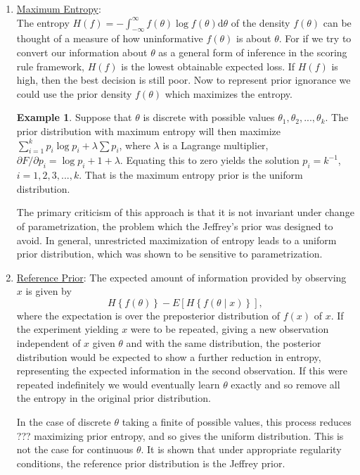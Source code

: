 \documentclass[lecture,12pt,]{pcms-l}
\numberwithin{section}{chapter}
\numberwithin{equation}{chapter}
\theoremstyle{plain}
\theoremstyle{definition}
\newtheorem{example}{Example}[section]
\theoremstyle{definition}
\begin{document}
\begin{enumerate}
\item \underline{Maximum Entropy}:
\\
The entropy $H(f)=-\int_{-\infty}^{\infty}f(\theta) \log f(\theta) \mathrm{d} \theta$ of the density $f(\theta)$ can be thought of a measure of how uninformative $f(\theta)$ is about $\theta$. For if we try to convert our information about $\theta$ as a general form of inference in the scoring rule framework, $H(f)$ is the lowest obtainable expected loss. If $H(f)$ is high, then the best decision is still poor. Now to represent prior ignorance we could use the prior density $f(\theta)$ which maximizes the entropy.
\begin{example}
Suppose that $\theta$ is discrete with possible values $\theta_1, \theta_2, ..., \theta_k$. The prior distribution with maximum entropy will then maximize $\sum_{i=1}^{k} p_i \log p_i + \lambda \sum p_i$, where $\lambda$ is a Lagrange multiplier, $\partial F / \partial p_i =  \log p_i+1+\lambda$. Equating this to zero yields the solution $p_i=k^{-1}$, $i=1,2,3,...,k$. That is the maximum entropy prior is the uniform distribution. 
\end{example}
The primary criticism of this approach is that it is not invariant under change of parametrization, the problem which the Jeffrey's  prior was designed to avoid. In general, unrestricted maximization of entropy leads to a uniform prior distribution, which was shown to be sensitive to parametrization.
\\
\item \underline{Reference Prior}:
The expected amount of information provided by observing $x$ is given by
\begin{equation}
H\left \{  f(\theta)\right \}-E \left [ H \left \{ f(\theta \mid x) \right \} \right ],
\end{equation}  
where the expectation is over the preposterior distribution of $f(x)$ of $x$. If the experiment yielding $x$ were to be repeated, giving a new observation independent of $x$ given $\theta$ and with the same distribution, the posterior distribution would be expected to show a further reduction in entropy, representing the expected information in the second observation. If this were repeated indefinitely we would eventually learn $\theta$ exactly and so remove all the entropy in the original prior distribution.

In the case of discrete $\theta$ taking a finite of possible values, this process reduces  ??? maximizing prior entropy, and so gives the uniform distribution. This is not the case for continuous $\theta$. It is shown that under appropriate regularity conditions, the reference prior distribution is the Jeffrey prior.
\end{enumerate}
\end{document}
